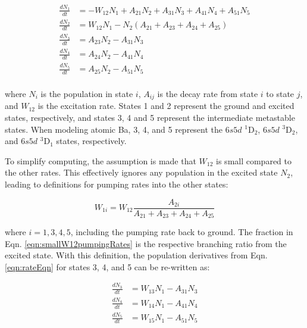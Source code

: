 
\begin{equation}
\begin{aligned}
\frac{dN_1}{dt} &= - W_{12}N_{1} + A_{21}N_{2} + A_{31}N_{3} + A_{41}N_{4} + A_{51} N_{5} \\
\frac{dN_2}{dt} &= W_{12}N_{1} - N_{2}(A_{21} + A_{23} + A_{24} + A_{25}) \\
\frac{dN_3}{dt} &= A_{23}N_{2} - A_{31}N_{3} \\
\frac{dN_4}{dt} &= A_{24}N_{2} - A_{41}N_{4} \\
\frac{dN_5}{dt} &= A_{25}N_{2} - A_{51}N_{5} \\
\end{aligned}
\label{eqn:rateEqn}
\end{equation}

\noindent
where $N_{i}$ is the population in state $i$, $A_{ij}$ is the decay rate from state $i$ to state $j$, and $W_{12}$ is the excitation rate.  States 1 and 2 represent the ground and excited states, respectively, and states 3, 4 and 5 represent the intermediate metastable states.  When modeling atomic Ba, 3, 4, and 5 represent the $6s5d$ $^{1}$D$_{2}$, $6s5d$ $^{3}$D$_{2}$, and $6s5d$ $^{3}$D$_{1}$ states, respectively.

To simplify computing, the assumption is made that $W_{12}$ is small compared to the other rates.  This effectively ignores any population in the excited state $N_{2}$, leading to definitions for pumping rates into the other states:

\begin{equation}
W_{1i} = W_{12}\frac{A_{2i}}{A_{21} + A_{23} + A_{24} + A_{25}}
\label{eqn:smallW12pumpingRates}
\end{equation}

\noindent
where $i = 1,3,4,5$, including the pumping rate back to ground.  The fraction in Eqn. \ref{eqn:smallW12pumpingRates} is the respective branching ratio from the excited state.  With this definition, the population derivatives from Eqn. \ref{eqn:rateEqn} for states 3, 4, and 5 can be re-written as:

\begin{equation}
\begin{aligned}
\frac{dN_3}{dt} &= W_{13}N_{1} - A_{31}N_{3} \\
\frac{dN_4}{dt} &= W_{14}N_{1} - A_{41}N_{4} \\
\frac{dN_5}{dt} &= W_{15}N_{1} - A_{51}N_{5} \\
\end{aligned}
\label{eqn:smallW12populationRates}
\end{equation}

